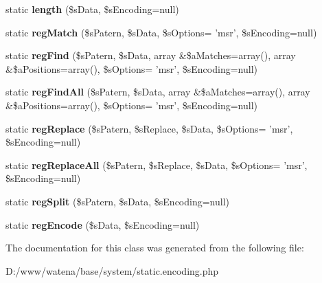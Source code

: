 \begin{DoxyCompactItemize}
\item 
\hypertarget{class_encoding_a265a28775799cda028b460e0b0d7c087}{static {\bfseries length} (\$s\-Data, \$s\-Encoding=null)}\label{class_encoding_a265a28775799cda028b460e0b0d7c087}

\item 
\hypertarget{class_encoding_af99932de9f3f93d7067f0c5d2e42eb8f}{static {\bfseries reg\-Match} (\$s\-Patern, \$s\-Data, \$s\-Options= 'msr', \$s\-Encoding=null)}\label{class_encoding_af99932de9f3f93d7067f0c5d2e42eb8f}

\item 
\hypertarget{class_encoding_a20af117b8643fb39ae545ad867a92192}{static {\bfseries reg\-Find} (\$s\-Patern, \$s\-Data, array \&\$a\-Matches=array(), array \&\$a\-Positions=array(), \$s\-Options= 'msr', \$s\-Encoding=null)}\label{class_encoding_a20af117b8643fb39ae545ad867a92192}

\item 
\hypertarget{class_encoding_a9c80c56b1809538236b2d2ccbbf51a1e}{static {\bfseries reg\-Find\-All} (\$s\-Patern, \$s\-Data, array \&\$a\-Matches=array(), array \&\$a\-Positions=array(), \$s\-Options= 'msr', \$s\-Encoding=null)}\label{class_encoding_a9c80c56b1809538236b2d2ccbbf51a1e}

\item 
\hypertarget{class_encoding_a096acb16f1859a339b2d98756dffc4ae}{static {\bfseries reg\-Replace} (\$s\-Patern, \$s\-Replace, \$s\-Data, \$s\-Options= 'msr', \$s\-Encoding=null)}\label{class_encoding_a096acb16f1859a339b2d98756dffc4ae}

\item 
\hypertarget{class_encoding_ade2cc92527c0c1a4a106639440d55f65}{static {\bfseries reg\-Replace\-All} (\$s\-Patern, \$s\-Replace, \$s\-Data, \$s\-Options= 'msr', \$s\-Encoding=null)}\label{class_encoding_ade2cc92527c0c1a4a106639440d55f65}

\item 
\hypertarget{class_encoding_aca3e57125b594de2e3e60e56872cc59d}{static {\bfseries reg\-Split} (\$s\-Patern, \$s\-Data, \$s\-Encoding=null)}\label{class_encoding_aca3e57125b594de2e3e60e56872cc59d}

\item 
\hypertarget{class_encoding_ab1b6bd1711227643ac3be5600f0ba825}{static {\bfseries reg\-Encode} (\$s\-Data, \$s\-Encoding=null)}\label{class_encoding_ab1b6bd1711227643ac3be5600f0ba825}

\end{DoxyCompactItemize}


The documentation for this class was generated from the following file\-:\begin{DoxyCompactItemize}
\item 
D\-:/www/watena/base/system/static.\-encoding.\-php\end{DoxyCompactItemize}
